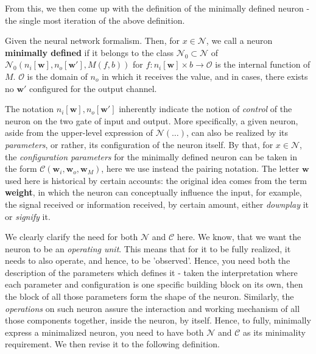 From this, we then come up with the definition of the minimally defined neuron - the single most iteration of the above definition. 

\begin{definition}
    Given the neural network formalism. Then, for $x\in \mathcal{N}$, we call a neuron \textbf{minimally defined} if it belongs to the class $\mathcal{N}_{0}\subset \mathcal{N}$ of $\mathcal{N}_{0}(n_{i}[\mathbf{w}],n_{o}[\mathbf{w}'],M(f,b))$ for $f:n_{i}[\mathbf{w}]\times b \to \mathcal{O}$ is the internal function of $M$. $\mathcal{O}$ is the domain of $n_{o}$ in which it receives the value, and in cases, there exists no $\mathbf{w}'$ configured for the output channel. %
\end{definition}

The notation $n_{i}[\mathbf{w}], n_{o}[\mathbf{w}']$ inherently indicate the notion of \textit{control} of the neuron on the two gate of input and output. More specifically, a given neuron, aside from the upper-level expression of $\mathcal{N}(\dots)$, can also be realized by its \textit{parameters}, or rather, its configuration of the neuron itself. By that, for $x \in \mathcal{N}$, the \textit{configuration parameters} for the minimally defined neuron can be taken in the form $\mathcal{C}(\mathbf{w}_{i}, \mathbf{w}_{o}, \mathbf{w}_{M})$, here we use instead the pairing notation. The letter $\mathbf{w}$ used here is historical by certain accounts: the original idea comes from the term \textbf{weight}, in which the neuron can conceptually influence the input, for example, the signal received or information received, by certain amount, either \textit{downplay} it or \textit{signify} it.

We clearly clarify the need for both $\mathcal{N}$ and $\mathcal{C}$ here. We know, that we want the neuron to be an \textit{operating unit}. This means that for it to be fully realized, it needs to also operate, and hence, to be 'observed'. Hence, you need both the description of the parameters which defines it - taken the interpretation where each parameter and configuration is one specific building block on its own, then the block of all those parameters form the shape of the neuron. Similarly, the \textit{operations} on such neuron assure the interaction and working mechanism of all those components together, inside the neuron, by itself. Hence, to fully, minimally express a minimalized neuron, you need to have both $\mathcal{N}$  and $\mathcal{C}$ as its minimality requirement. We then revise it to the following definition. 

